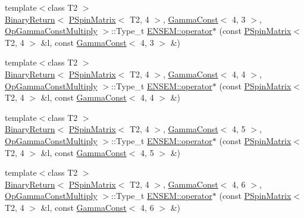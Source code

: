 \begin{DoxyCompactItemize}
\item 
{\footnotesize template$<$class T2 $>$ }\\\mbox{\hyperlink{structENSEM_1_1BinaryReturn}{Binary\+Return}}$<$ \mbox{\hyperlink{classENSEM_1_1PSpinMatrix}{P\+Spin\+Matrix}}$<$ T2, 4 $>$, \mbox{\hyperlink{classENSEM_1_1GammaConst}{Gamma\+Const}}$<$ 4, 3 $>$, \mbox{\hyperlink{structENSEM_1_1OpGammaConstMultiply}{Op\+Gamma\+Const\+Multiply}} $>$\+::Type\+\_\+t \mbox{\hyperlink{group__primspinmatrix_ga4489f67258a145c07f7805077699ec24}{E\+N\+S\+E\+M\+::operator$\ast$}} (const \mbox{\hyperlink{classENSEM_1_1PSpinMatrix}{P\+Spin\+Matrix}}$<$ T2, 4 $>$ \&l, const \mbox{\hyperlink{classENSEM_1_1GammaConst}{Gamma\+Const}}$<$ 4, 3 $>$ \&)
\item 
{\footnotesize template$<$class T2 $>$ }\\\mbox{\hyperlink{structENSEM_1_1BinaryReturn}{Binary\+Return}}$<$ \mbox{\hyperlink{classENSEM_1_1PSpinMatrix}{P\+Spin\+Matrix}}$<$ T2, 4 $>$, \mbox{\hyperlink{classENSEM_1_1GammaConst}{Gamma\+Const}}$<$ 4, 4 $>$, \mbox{\hyperlink{structENSEM_1_1OpGammaConstMultiply}{Op\+Gamma\+Const\+Multiply}} $>$\+::Type\+\_\+t \mbox{\hyperlink{group__primspinmatrix_gafa880313515ac76955c6c4de7513add3}{E\+N\+S\+E\+M\+::operator$\ast$}} (const \mbox{\hyperlink{classENSEM_1_1PSpinMatrix}{P\+Spin\+Matrix}}$<$ T2, 4 $>$ \&l, const \mbox{\hyperlink{classENSEM_1_1GammaConst}{Gamma\+Const}}$<$ 4, 4 $>$ \&)
\item 
{\footnotesize template$<$class T2 $>$ }\\\mbox{\hyperlink{structENSEM_1_1BinaryReturn}{Binary\+Return}}$<$ \mbox{\hyperlink{classENSEM_1_1PSpinMatrix}{P\+Spin\+Matrix}}$<$ T2, 4 $>$, \mbox{\hyperlink{classENSEM_1_1GammaConst}{Gamma\+Const}}$<$ 4, 5 $>$, \mbox{\hyperlink{structENSEM_1_1OpGammaConstMultiply}{Op\+Gamma\+Const\+Multiply}} $>$\+::Type\+\_\+t \mbox{\hyperlink{group__primspinmatrix_ga02ed9e6e920eca4f600dd06655fb2a42}{E\+N\+S\+E\+M\+::operator$\ast$}} (const \mbox{\hyperlink{classENSEM_1_1PSpinMatrix}{P\+Spin\+Matrix}}$<$ T2, 4 $>$ \&l, const \mbox{\hyperlink{classENSEM_1_1GammaConst}{Gamma\+Const}}$<$ 4, 5 $>$ \&)
\item 
{\footnotesize template$<$class T2 $>$ }\\\mbox{\hyperlink{structENSEM_1_1BinaryReturn}{Binary\+Return}}$<$ \mbox{\hyperlink{classENSEM_1_1PSpinMatrix}{P\+Spin\+Matrix}}$<$ T2, 4 $>$, \mbox{\hyperlink{classENSEM_1_1GammaConst}{Gamma\+Const}}$<$ 4, 6 $>$, \mbox{\hyperlink{structENSEM_1_1OpGammaConstMultiply}{Op\+Gamma\+Const\+Multiply}} $>$\+::Type\+\_\+t \mbox{\hyperlink{group__primspinmatrix_gaf04b1dbd5214d0a0e3a846a865a23f0e}{E\+N\+S\+E\+M\+::operator$\ast$}} (const \mbox{\hyperlink{classENSEM_1_1PSpinMatrix}{P\+Spin\+Matrix}}$<$ T2, 4 $>$ \&l, const \mbox{\hyperlink{classENSEM_1_1GammaConst}{Gamma\+Const}}$<$ 4, 6 $>$ \&)

\end{DoxyCompactItemize}
